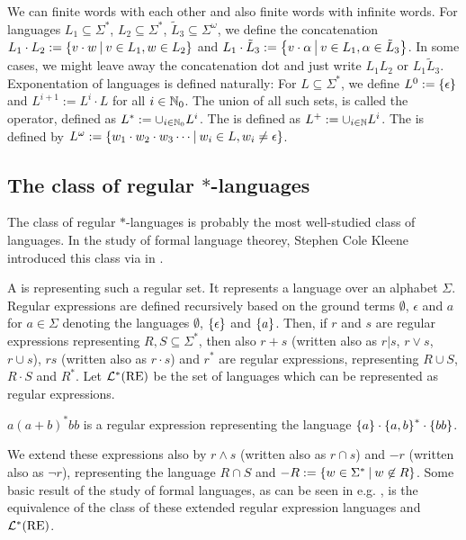 We can  finite words with each other and also finite words with infinite words. For languages $L_1 \subseteq \Sigma^*$, $L_2 \subseteq \Sigma^*$, $\tilde L_3 \subseteq \Sigma^\omega$, we define the concatenation $L_1 \cdot L_2 := \Set{v \cdot w}{v \in L_1, w \in L_2}$ and $L_1 \cdot \tilde L_3 := \Set{v \cdot \alpha}{v \in L_1, \alpha \in \tilde L_3}$. In some cases, we might leave away the concatenation dot and just write $L_1 L_2$ or $L_1 \tilde L_3$. Exponentation of languages is defined naturally: For $L \subseteq \Sigma^*$, we define $L^0 := \Set{\epsilon}$ and $L^{i+1} := L^i \cdot L$ for all $i \in \mathbb{N}_0$. The union of all such sets, is called the  operator, defined as $L^* := \cup_{i\in\mathbb{N}_0} L^i$. The  is defined as $L^+ := \cup_{i\in\mathbb{N}} L^i$. The  is defined by $L^\omega := \Set{w_1 \cdot w_2 \cdot w_3 \cdots}{w_i \in L, w_i \ne \epsilon}$.

\subsection{The class of regular $*$-languages}
\label{intro:reglang}

The class of regular $*$-languages is probably the most well-studied class of languages. In the study of formal language theorey, Stephen Cole Kleene introduced this class via  in \cite{Kleene56}.

A  is representing such a regular set. It represents a language over an alphabet $\Sigma$. Regular expressions are defined recursively based on the ground terms $\emptyset$, $\epsilon$ and $a$ for $a \in \Sigma$ denoting the languages $\emptyset$, $\Set{\epsilon}$ and $\Set{a}$. Then, if $r$ and $s$ are regular expressions representing $R, S \subseteq \Sigma^*$, then also $r+s$ (written also as $r|s$, $r \vee s$, $r \cup s$), $r s$ (written also as $r \cdot s$) and $r^*$ are regular expressions, representing $R \cup S$, $R \cdot S$ and $R^*$. Let $\mathcal{L}^*(\text{RE})$ be the set of languages which can be represented as regular expressions.

\begin{simpleexample}
$a(a+b)^*bb$ is a regular expression representing the language $\Set{a} \cdot \Set{a,b}^* \cdot \Set{bb}$.
\end{simpleexample}

We extend these expressions also by $r \wedge s$ (written also as $r \cap s$) and $-r$ (written also as $\neg r$), representing the language $R \cap S$ and $-R := \Set{w \in \Sigma^*}{w \not\in R}$. Some basic result of the study of formal languages, as can be seen in e.g. \cite{FinAutLogR109}, is the equivalence of the class of these extended regular expression languages and $\mathcal{L}^*(\text{RE})$.

